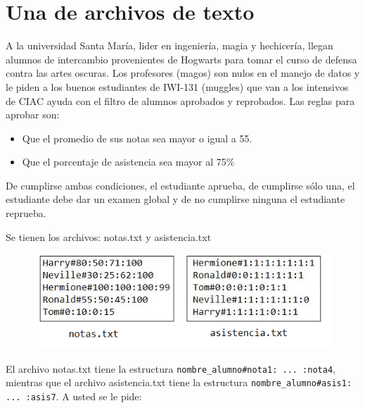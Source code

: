 \section{Una de archivos de texto}

A la universidad Santa María, lider en ingeniería, magia y hechicería, llegan alumnos de intercambio provenientes de Hogwarts para tomar el curso de defensa contra las artes oscuras. Los profesores (magos) son nulos en el manejo de datos y le piden a los buenos estudiantes de IWI-131 (muggles) que van a los intensivos de CIAC ayuda con el filtro de alumnos aprobados y reprobados. Las reglas para aprobar son:
\begin{itemize}
    \item Que el promedio de sus notas sea mayor o igual a 55.
    \item Que el porcentaje de asistencia sea mayor al 75\%
\end{itemize}

De cumplirse ambas condiciones, el estudiante aprueba, de cumplirse sólo una, el estudiante debe dar un examen global y de no cumplirse ninguna el estudiante reprueba.

Se tienen los archivos: notas.txt y asistencia.txt

\begin{figure}[h]
    \centering
    \includegraphics[scale=0.9]{Imagenes/archivos1.jpg}
\end{figure}

El archivo notas.txt tiene la estructura \texttt{nombre\_alumno\#nota1: ... :nota4}, mientras que el archivo asistencia.txt tiene la estructura \texttt{nombre\_alumno\#asis1: ... :asis7}. A usted se le pide:

